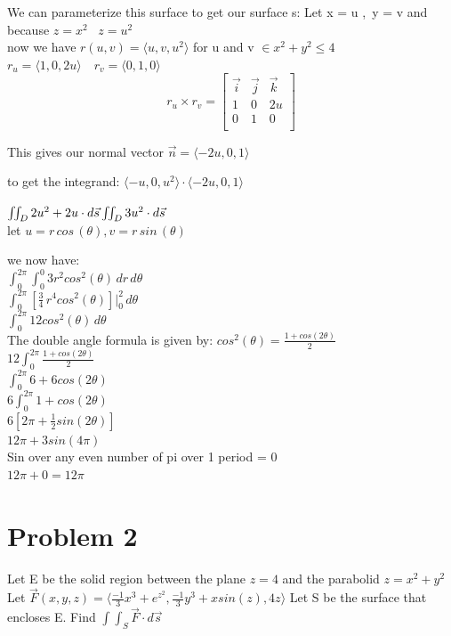 \documentclass[12pt]{amsart}
\newcommand{\surfint}[1]{\iint_D {#1} \cdot d\vec{s}}
\newcommand{\vectr}[3]{\langle {#1} , {#2} , {#3} \rangle}
\begin{document}
We can parameterize this surface to get our surface s: 
Let x = u ,\, y = v and because $z = x^2$ \, $z = u^2$ \\
now we have $r(u,v) = \vectr{u}{v}{u^2}$ for u and v $\in x^2 + y^2 \leq 4$ \\ 
$r_u = \vectr{1}{0}{2u} \quad r_v = \vectr{0}{1}{0}$ \\
\[
r_u \times r_v = \begin{bmatrix}
    \vec{i}  &  \vec{j}   & \vec{k} \\
       1     &    0       &  2u     \\
       0     &    1       &  0      \\
\end{bmatrix}
\]

This gives our normal vector $\vec{n} = \vectr{-2u}{0}{1}$

to get the integrand: $\vectr{-u}{0}{u^2} \cdot \vectr{-2u}{0}{1}$

$\surfint{2u^2 + 2u} \\ 
 \surfint{3u^2}$ \\
let \quad $u = r\,cos\,(\theta) , v = r\,sin\,(\theta)$

we now have: \\ 
$\int_{0}^{2\pi} \int_{0}^{0} 3r^2cos^2(\theta) \, dr \,d\theta$ \\
$\int_{0}^{2\pi} [\frac{3}{4}\,r^4cos^2(\theta)] \big|_0^2 \, d\theta$ \\
$\int_{0}^{2\pi} 12cos^2(\theta) \, d\theta$ \\
The double angle formula is given by: $cos^2(\theta) = \frac{1+cos(2\theta)}{2}$ \\
$12 \int_{0}^{2\pi} \frac{1+cos(2\theta)}{2}$ \\
$\int_{0}^{2\pi} 6+6cos(2\theta)$ \\
$6 \int_{0}^{2\pi} 1 + cos(2\theta)$ \\
$6[2\pi + \frac{1}{2}sin(2\theta)]$ \\
$12\pi + 3sin(4\pi)$ \\
Sin over any even number of pi over 1 period = 0 \\
$12\pi + 0 = 12\pi$ 




\section{Problem 2}

Let E be the solid region between the plane $z = 4$ and the parabolid $z = x^2 + y^2$
Let $\vec{F}(x,y,z) = \langle \frac{-1}{3}x^3 + e^{z^2} , \frac{-1}{3}y^3 +xsin(z) , 4z \rangle$
Let S be the surface that encloses E.
Find $\int \int_S \vec{F} \cdot d\vec{s}$
\end{document}
